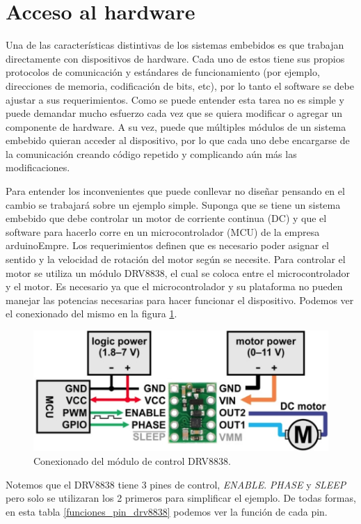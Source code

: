 \minitoc



\section{Acceso al hardware}
\label{Accesoalhardware}
Una de las características distintivas de los sistemas embebidos es que trabajan directamente con dispositivos de hardware. Cada uno de estos tiene sus propios protocolos de comunicación y estándares de funcionamiento (por ejemplo, direcciones de memoria, codificación de bits, etc), por lo tanto el software se debe ajustar a sus requerimientos. Como se puede entender esta tarea no es simple y puede demandar mucho esfuerzo cada vez que se quiera modificar o agregar un componente de hardware. A su vez, puede que múltiples módulos de un sistema embebido quieran acceder al dispositivo, por lo que cada uno debe encargarse de la comunicación creando código repetido y complicando aún más las modificaciones. 

Para entender los inconvenientes que puede conllevar no diseñar pensando en el cambio se trabajará sobre un ejemplo simple. Suponga que se tiene un sistema embebido que debe controlar un motor de corriente continua (\gls{DC}) y que el software para hacerlo corre en un microcontrolador (MCU) de la empresa \gls{arduinoEmpre}. Los requerimientos definen que es necesario poder asignar el sentido y la velocidad de rotación del motor según se necesite. Para controlar el motor se utiliza un módulo \gls{DRV8838}, el cual se coloca entre el microcontrolador y el motor. Es necesario ya que el microcontrolador y su plataforma no pueden manejar las potencias necesarias para hacer funcionar el dispositivo. Podemos ver el conexionado del mismo en la figura \ref{drv8838}.

\begin{figure}[h]
    \centering
    \includegraphics[width=0.65\linewidth]{drv8838.png}
    \caption{Conexionado del módulo de control DRV8838.}
    \label{drv8838}
\end{figure}

Notemos que el \gls{DRV8838} tiene 3 pines de control, \textit{ENABLE}. \textit{PHASE} y \textit{SLEEP} pero solo se utilizaran los 2 primeros para simplificar el ejemplo. De todas formas, en esta tabla \ref{funciones_pin_drv8838} podemos ver la función de cada pin.


